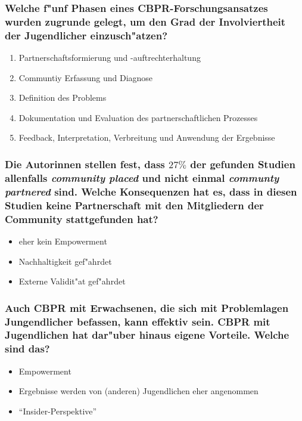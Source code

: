 \subsubsection{Welche f"unf Phasen eines CBPR-Forschungsansatzes wurden zugrunde gelegt, um den Grad der Involviertheit der Jugendlicher einzusch"atzen?}
\begin{enumerate}
        \item Partnerschaftsformierung und -auftrechterhaltung
        \item Communtiy Erfassung und Diagnose
        \item Definition des Problems
        \item Dokumentation und Evaluation des partnerschaftlichen Prozesses
        \item Feedback, Interpretation, Verbreitung und Anwendung der Ergebnisse
\end{enumerate}

\subsubsection{Die Autorinnen stellen fest, dass $27\%$ der gefunden Studien allenfalls \emph{community placed} und nicht einmal \emph{communty partnered} sind. Welche Konsequenzen hat es, dass in diesen Studien keine Partnerschaft mit den Mitgliedern der Community stattgefunden hat?}
\begin{itemize}
        \item eher kein Empowerment
        \item Nachhaltigkeit gef"ahrdet
        \item Externe Validit"at gef"ahrdet
\end{itemize}

\subsubsection{Auch CBPR mit Erwachsenen, die sich mit Problemlagen Jungendlicher befassen, kann effektiv sein. CBPR mit Jugendlichen hat dar"uber hinaus eigene Vorteile. Welche sind das?}
\begin{itemize}
        \item Empowerment
        \item Ergebnisse werden von (anderen) Jugendlichen eher angenommen
        \item ``Insider-Perspektive''
\end{itemize}

